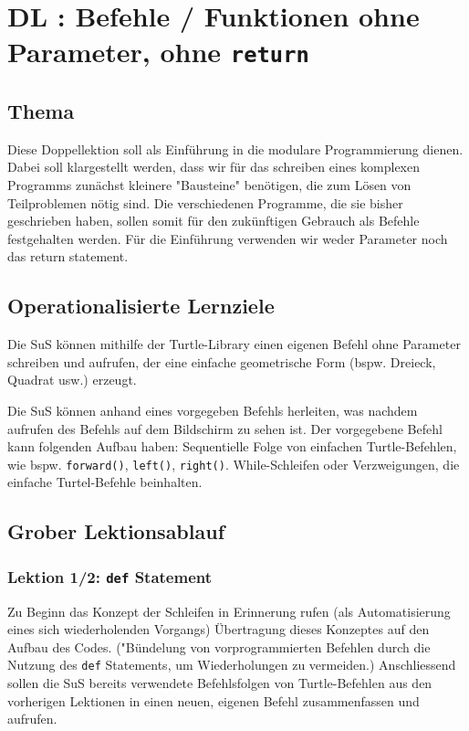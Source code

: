 \section{DL \themycounter: Befehle / Funktionen ohne Parameter, ohne \texorpdfstring{\lstinline|return|}{return}}
\begin{myExBox}[title=DL \themycounter]
\subsection*{Thema}
Diese Doppellektion soll als Einführung in die modulare Programmierung dienen. Dabei soll klargestellt werden, dass wir für das schreiben eines komplexen Programms zunächst kleinere "Bausteine" benötigen, die zum Lösen von Teilproblemen nötig sind. Die verschiedenen Programme, die sie bisher geschrieben haben, sollen somit für den zukünftigen Gebrauch als Befehle festgehalten werden. Für die Einführung verwenden wir weder Parameter noch das return statement.

\subsection*{Operationalisierte Lernziele}
\begin{todolist}
    \item Die SuS können mithilfe der Turtle-Library einen eigenen Befehl ohne Parameter schreiben und aufrufen, der eine einfache geometrische Form (bspw. Dreieck, Quadrat usw.) erzeugt.
    \item Die SuS können anhand eines vorgegeben Befehls herleiten, was nachdem aufrufen des Befehls auf dem Bildschirm zu sehen ist. Der vorgegebene Befehl kann folgenden Aufbau haben: Sequentielle Folge von einfachen Turtle-Befehlen, wie bspw. \lstinline|forward()|, \lstinline|left()|, \lstinline|right()|. While-Schleifen oder Verzweigungen, die einfache Turtel-Befehle beinhalten.
\end{todolist}

\subsection*{Grober Lektionsablauf}
\subsubsection*{Lektion 1/2:  \lstinline|def| Statement}
Zu Beginn das Konzept der Schleifen in Erinnerung rufen (als Automatisierung eines sich wiederholenden Vorgangs) Übertragung dieses Konzeptes auf den Aufbau des Codes. ("Bündelung von vorprogrammierten Befehlen durch die Nutzung des \lstinline|def| Statements, um Wiederholungen zu vermeiden.) Anschliessend sollen die SuS bereits verwendete Befehlsfolgen von Turtle-Befehlen aus den vorherigen Lektionen in einen neuen, eigenen Befehl zusammenfassen und aufrufen. 


\end{myExBox}
